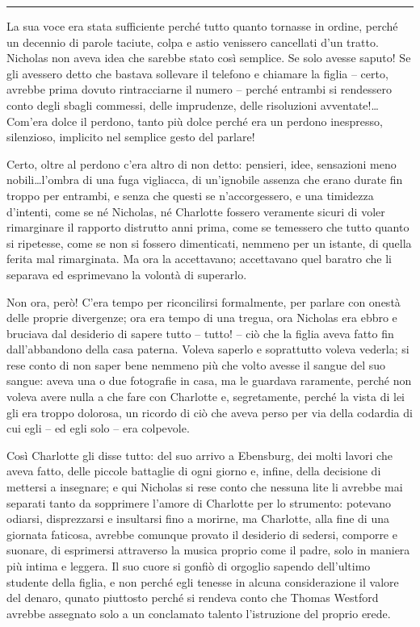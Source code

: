 \documentclass[a4paper,oneside,11pt]{memoir}
\begin{document}
\plainbreak{1}

La sua voce era stata sufficiente perché tutto quanto tornasse in ordine, perché
un decennio di parole taciute, colpa e astio venissero cancellati d'un tratto.
Nicholas non aveva idea che sarebbe stato così semplice. Se solo avesse saputo!
Se gli avessero detto che bastava sollevare il telefono e chiamare la figlia --
certo, avrebbe prima dovuto rintracciarne il numero -- perché entrambi si
rendessero conto degli sbagli commessi, delle imprudenze, delle risoluzioni
avventate!\dots Com'era dolce il perdono, tanto più dolce perché era un perdono
inespresso, silenzioso, implicito nel semplice gesto del parlare!

Certo, oltre al perdono c'era altro di non detto: pensieri, idee, sensazioni
meno nobili\dots l'ombra di una fuga vigliacca, di un'ignobile assenza che
erano durate fin troppo per entrambi, e senza che questi se n'accorgessero, e
una timidezza d'intenti, come se né Nicholas, né Charlotte fossero veramente
sicuri di voler rimarginare il rapporto distrutto anni prima, come se temessero
che tutto quanto si ripetesse, come se non si fossero dimenticati, nemmeno per
un istante, di quella ferita mal rimarginata. Ma ora la accettavano; accettavano
quel baratro che li separava ed esprimevano la volontà di superarlo.

Non ora, però! C'era tempo per riconcilirsi formalmente, per parlare con onestà
delle proprie divergenze; ora era tempo di una tregua, ora Nicholas era ebbro e
bruciava dal desiderio di sapere tutto -- tutto! -- ciò che la figlia aveva
fatto fin dall'abbandono della casa paterna. Voleva saperlo e soprattutto voleva
vederla; si rese conto di non saper bene nemmeno più che volto avesse il sangue
del suo sangue: aveva una o due fotografie in casa, ma le guardava raramente,
perché non voleva avere nulla a che fare con Charlotte e, segretamente, perché
la vista di lei gli era troppo dolorosa, un ricordo di ciò che aveva perso per
via della codardia di cui egli -- ed egli solo -- era colpevole.

Così Charlotte gli disse tutto: del suo arrivo a Ebensburg, dei molti lavori che
aveva fatto, delle piccole battaglie di ogni giorno e, infine, della decisione
di mettersi a insegnare; e qui Nicholas si rese conto che nessuna lite li
avrebbe mai separati tanto da sopprimere l'amore di Charlotte per lo strumento:
potevano odiarsi, disprezzarsi e insultarsi fino a morirne, ma Charlotte, alla
fine di una giornata faticosa, avrebbe comunque provato il desiderio di sedersi,
comporre e suonare, di esprimersi attraverso la musica proprio come il padre,
solo in maniera più intima e leggera. Il suo cuore si gonfiò di orgoglio sapendo
dell'ultimo studente della figlia, e non perché egli tenesse in alcuna
considerazione il valore del denaro, qunato piuttosto perché si rendeva conto
che Thomas Westford avrebbe assegnato solo a un conclamato talento l'istruzione
del proprio erede.
\end{document}
